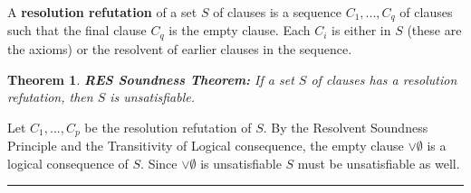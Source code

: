 \documentclass[twoside]{article}
\newcounter{lecnum}
\newtheorem{theorem}{Theorem}[lecnum]
\newenvironment{proof}{{\bf Proof:}}{\hfill\rule{2mm}{2mm}}
\begin{document}
A \textbf{resolution refutation} of a set $S$ of clauses is a sequence $C_1, ..., C_q$ of clauses such that the final clause $C_q$ is the empty clause. Each $C_i$ is either in $S$ (these are the axioms) or the resolvent of earlier clauses in the sequence. 

\begin{theorem}
\textbf{RES Soundness Theorem:} If a set $S$ of clauses has a resolution refutation, then $S$ is unsatisfiable. 
\end{theorem}
\begin{proof}
Let $C_1, ..., C_p$ be the resolution refutation of $S$. By the Resolvent Soundness Principle and the Transitivity of Logical consequence, the empty clause $\lor \emptyset$ is a logical consequence of $S$. Since $\lor \emptyset$ is unsatisfiable $S$ must be unsatisfiable as well.  
\end{proof}
\end{document}
